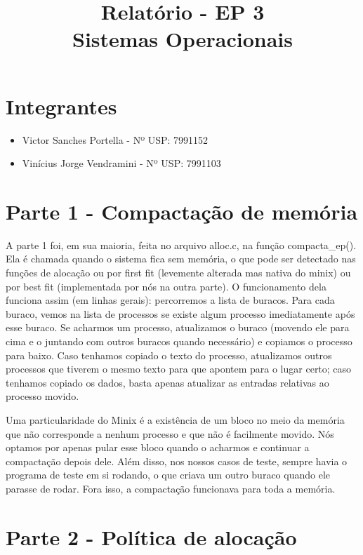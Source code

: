 \documentclass[11pt]{article}
\title{Relatório - EP 3 \\ Sistemas Operacionais}
\begin{document}
    \maketitle

    \section{Integrantes}

    \begin{itemize}
        \item Victor Sanches Portella - Nº USP: 7991152
        \item Vinícius Jorge Vendramini - Nº USP: 7991103
    \end{itemize}


    \section*{Parte 1 - Compactação de memória}

    A parte 1 foi, em sua maioria, feita no arquivo alloc.c, na função compacta\_ep(). Ela é chamada quando o sistema fica sem memória, o que pode ser detectado nas funções de alocação ou por first fit (levemente alterada mas nativa do minix) ou por best fit (implementada por nós na outra parte).
    O funcionamento dela funciona assim (em linhas gerais): percorremos a lista de buracos. Para cada buraco, vemos na lista de processos se existe algum processo imediatamente após esse buraco. Se acharmos um processo, atualizamos o buraco (movendo ele para cima e o juntando com outros buracos quando necessário) e copiamos o processo para baixo. Caso tenhamos copiado o texto do processo, atualizamos outros processos que tiverem o mesmo texto para que apontem para o lugar certo; caso tenhamos copiado os dados, basta apenas atualizar as entradas relativas ao processo movido.

    Uma particularidade do Minix é a existência de um bloco no meio da memória que não corresponde a nenhum processo e que não é facilmente movido. Nós optamos por apenas pular esse bloco quando o acharmos e continuar a compactação depois dele. Além disso, nos nossos casos de teste, sempre havia o programa de teste em si rodando, o que criava um outro buraco quando ele parasse de rodar. Fora isso, a compactação funcionava para toda a memória.

    \section*{Parte 2 - Política de alocação}
\end{document}

